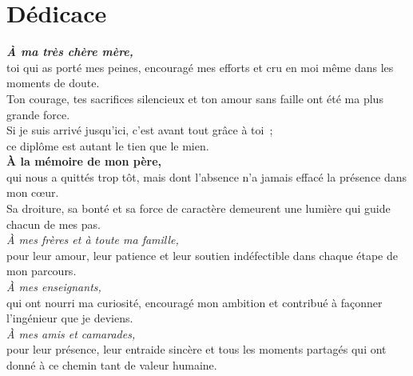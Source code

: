 \documentclass[12pt,a4paper]{report}
\begin{document}
\setcounter{page}{1}

\clearpage
\chapter*{Dédicace}
\thispagestyle{plain}

\vspace*{0.5cm}


\begin{flushright}
\itshape\large

{\large\itshape\color{espritblue}\textbf{À ma très chère mère,}}\\[6pt]
\color{textdark}
toi qui as porté mes peines, encouragé mes efforts et cru en moi même dans les moments de doute.\\
Ton courage, tes sacrifices silencieux et ton amour sans faille ont été ma plus grande force.\\
Si je suis arrivé jusqu'ici, c'est avant tout grâce à toi~;\\
ce diplôme est autant le tien que le mien.\\[0.5cm]

{\color{espritblue}\textbf{À la mémoire de mon père,}}\\[6pt]
\color{textdark}
qui nous a quittés trop tôt, mais dont l'absence n'a jamais effacé la présence dans mon cœur.\\
Sa droiture, sa bonté et sa force de caractère demeurent une lumière qui guide chacun de mes pas.\\
{\color{espritblue}\itshape À mes frères et à toute ma famille,}\\
{\color{textdark}pour leur amour, leur patience et leur soutien indéfectible dans chaque étape de mon parcours.}\\[0.6cm]

{\color{espritblue}\itshape À mes enseignants,}\\
{\color{textdark}qui ont nourri ma curiosité, encouragé mon ambition et contribué à façonner l'ingénieur que je deviens.}\\[0.6cm]

{\color{espritblue}\itshape À mes amis et camarades,}\\
{\color{textdark}pour leur présence, leur entraide sincère et tous les moments partagés qui ont donné à ce chemin tant de valeur humaine.}
\end{flushright}
\vfill
\end{document}
